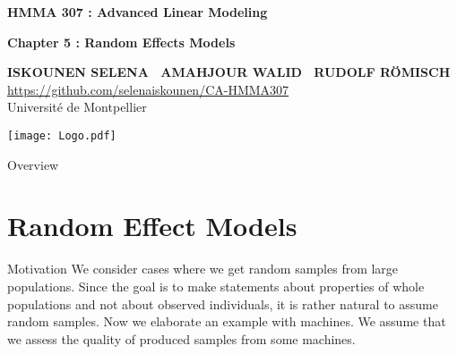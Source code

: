 \documentclass[unknownkeysallowed]{beamer}
\begin{document}
	
	
	
	
	
	\begin{frame}[noframenumbering]
		\thispagestyle{empty}
		\bigskip
		\bigskip
		\begin{center}{
				\LARGE\color{marron}
				\textbf{HMMA 307 : Advanced Linear Modeling}
				\textbf{ }\\
				\vspace{0.5cm}
			}
			
			\color{marron}
			\textbf{Chapter 5 : Random Effects Models}
		\end{center}
		
		\vspace{0.5cm}
		
		\begin{center}
			\textbf{ISKOUNEN SELENA \ AMAHJOUR WALID \ RUDOLF RÖMISCH } \\
			\vspace{0.1cm}
			\url{https://github.com/selenaiskounen/CA-HMMA307}\\
			\vspace{0.5cm}
			Université de Montpellier \\
		\end{center}
		
		\centering
		\texttt{[image: Logo.pdf]}
	\end{frame}
	
	\begin{frame}{Overview} 
		\tableofcontents
	\end{frame}
	
	\section{Random Effect Models}
	\begin{frame}{Motivation}
		We consider cases where we get random samples from large populations. 
		Since the goal is to make statements about properties of whole populations and not about observed individuals, it is rather natural to assume random samples. 
		Now we elaborate an example with machines. We assume that we assess the quality of produced samples from some machines.
		
	\end{frame}
	
\end{document}
